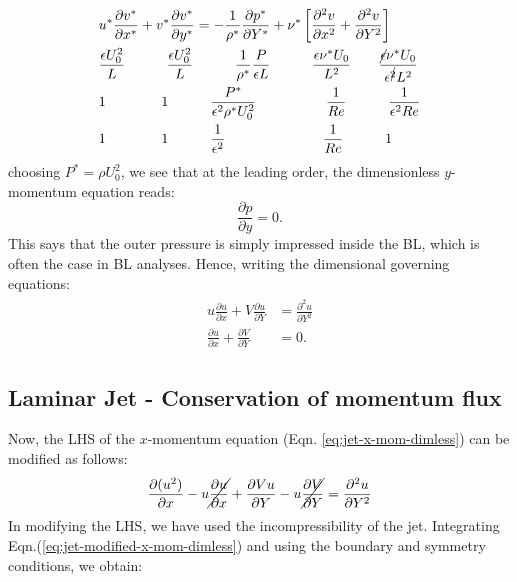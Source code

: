 \documentclass{article}
\begin{document}
\begin{align}\label{eq:jet-y-mom-scaling}
 \begin{split}
  & u^{*}\frac{\partial v^{*}}{\partial x^{*}} + v^{*} \frac{\partial v^{*}}{\partial y^{*}} = -\frac{1}{\rho^{*}}\frac{\partial p^{*} }{\partial Y^{*}} + \nu^{*}  \left[ \frac{\partial^{2} v}{\partial x^{2}} + \frac{\partial^{2} v}{\partial Y^{2}}\right]\\
  & \frac{\epsilon U_{0}^{2}}{L} \quad \quad \quad \frac{\epsilon U_{0}^{2}}{L} \quad \quad \quad  \frac{1}{\rho^{*}}\frac{P}{\epsilon L}\quad \quad \quad \frac{\epsilon \nu ^{*}U_{0}}{L^{2}} \quad \quad  \frac{\cancel{\epsilon} \nu ^{*}U_{0}}{\epsilon^{\cancel{2} } L^{2}}\\
  & 1 \quad \quad \quad \quad 1 \quad \quad \quad \frac{P^{*}}{\epsilon^{2}\rho^{*} U_{0}^{2}} \quad \quad \quad \quad \quad \frac{1}{Re} \quad \quad \quad \frac{1}{\epsilon^{2} Re}\\
  & 1 \quad \quad \quad \quad 1 \quad \quad \quad \frac{1}{\epsilon^{2}} \quad \quad \quad \quad \quad \quad \quad \frac{1}{Re} \quad \quad \quad 1\\
 \end{split}
\end{align}
choosing $P^{*} = \rho U_{0}^{2}$, we see that at the leading order, the dimensionless $y$-momentum equation reads:
\begin{equation}\label{eq:jet-y-mom-dimless}
 \frac{\partial p}{\partial y} = 0.
\end{equation}
%
This says that the outer pressure is simply impressed inside the BL, which is often the case in BL analyses. Hence, writing the dimensional governing equations:
\begin{align}\label{eq:jet-gov-eqns-dimless}
 \begin{split}
   u \frac{\partial u}{\partial x} + V \frac{\partial u}{\partial Y} &= \frac{\partial^{2} u}{\partial Y^{2}}\\
    \frac{\partial u}{\partial x} + \frac{\partial V}{\partial Y} &= 0.
 \end{split}
\end{align}
%
\subsection{Laminar Jet - Conservation of momentum flux}

Now, the LHS of the $x$-momentum equation (Eqn. \ref{eq:jet-x-mom-dimless}) can be modified as follows:
\begin{equation}\label{eq:jet-modified-x-mom-dimless}
 \frac{\partial (u^{2})}{\partial x} - u \cancel{\frac{\partial u}{\partial x}} + \frac{\partial Vu}{\partial Y} - u \cancel {\frac{\partial V}{\partial Y}} = \frac{\partial^{2} u}{\partial Y^{2}}
\end{equation}
%
In modifying the LHS, we have used the incompressibility of the jet. Integrating Eqn.(\ref{eq:jet-modified-x-mom-dimless}) and using the boundary and symmetry conditions, we obtain:
\end{document}
